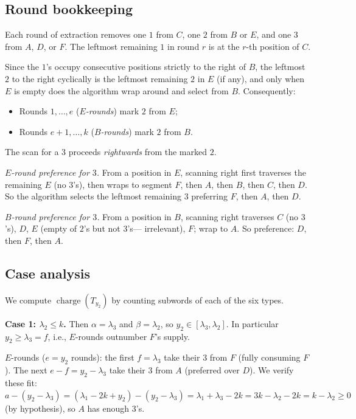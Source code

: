 \documentclass[11pt]{article}
\theoremstyle{definition}
\theoremstyle{remark}
\DeclareMathOperator{\charge}{charge}
\begin{document}
\subsection*{Round bookkeeping}

Each round of extraction removes one $1$ from $C$, one $2$ from $B$ or $E$,
and one $3$ from $A$, $D$, or $F$. The leftmost remaining $1$ in round $r$
is at the $r$-th position of $C$.

Since the $1$'s occupy consecutive positions strictly to the right of $B$,
the leftmost $2$ to the right cyclically is the leftmost remaining $2$ in
$E$ (if any), and only when $E$ is empty does the algorithm wrap around
and select from $B$. Consequently:
\begin{itemize}
    \item Rounds $1,\ldots,e$ (\emph{$E$-rounds}) mark $2$ from $E$;
    \item Rounds $e+1,\ldots,k$ (\emph{$B$-rounds}) mark $2$ from $B$.
\end{itemize}
The scan for a $3$ proceeds \emph{rightwards} from the marked $2$.

\emph{$E$-round preference for $3$.} From a position in $E$, scanning
right first traverses the remaining $E$ (no $3$'s), then wraps to
segment $F$, then $A$, then $B$, then $C$, then $D$. So the algorithm
selects the leftmost remaining $3$ preferring $F$, then $A$, then $D$.

\emph{$B$-round preference for $3$.} From a position in $B$, scanning
right traverses $C$ (no $3$'s), $D$, $E$ (empty of $2$'s but not $3$'s---
irrelevant), $F$; wrap to $A$. So preference: $D$, then $F$, then $A$.

\subsection*{Case analysis}

We compute $\charge(T_{y_2})$ by counting subwords of each of the six
types.

\smallskip

\noindent\textbf{Case 1: $\lambda_2 \le k$.} Then $\alpha = \lambda_3$ and
$\beta = \lambda_2$, so $y_2 \in [\lambda_3, \lambda_2]$. In particular
$y_2 \ge \lambda_3 = f$, i.e., $E$-rounds outnumber $F$'s supply.

$E$-rounds ($e = y_2$ rounds): the first $f = \lambda_3$ take their $3$
from $F$ (fully consuming $F$). The next $e - f = y_2 - \lambda_3$
take their $3$ from $A$ (preferred over $D$). We verify these fit:
$a - (y_2 - \lambda_3) = (\lambda_1 - 2k + y_2) - (y_2 - \lambda_3) =
\lambda_1 + \lambda_3 - 2k = 3k - \lambda_2 - 2k = k - \lambda_2 \ge 0$
(by hypothesis), so $A$ has enough $3$'s.
\end{document}
